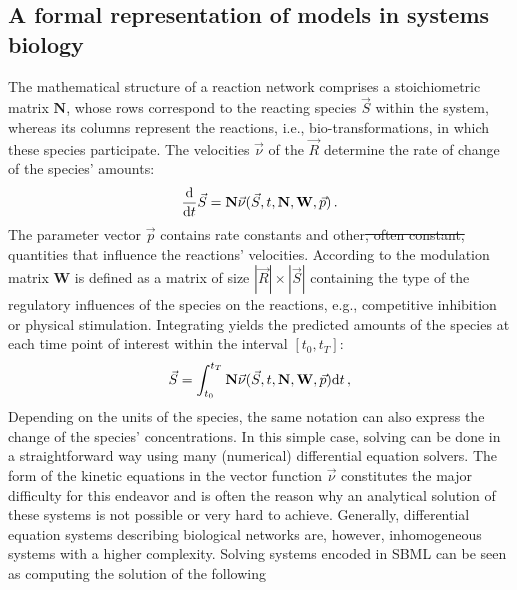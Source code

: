 \documentclass[10pt]{bmc_article}
\newenvironment{bmcformat}{\begin{raggedright}\baselineskip20pt\sloppy\setboolean{publ}{false}}{\end{raggedright}\baselineskip20pt\sloppy}
\begin{document}
\begin{bmcformat}
\subsection*{A formal representation of models in systems biology}

The mathematical structure of a reaction network comprises a stoichiometric
matrix $\mathbf{N}$, whose rows correspond to the reacting species $\vec{S}$
within the system, whereas its columns represent the reactions, i.e., bio-transformations,
in which these species participate.
The velocities $\vec{\nu}$ of the  $\vec{R}$ determine the rate of
change of the species' amounts:
\begin{equation}
\frac{\mathrm{d}}{\mathrm{d} t}\vec{S} = \mathbf{N}\vec{\nu}(\vec{S}, t, \mathbf{N}, \mathbf{W}, \vec{p})\,.
\label{eq:SpeciesChange}
\end{equation}
The parameter vector $\vec{p}$ contains rate constants
and other\sout{, often constant,} quantities that influence the reactions' velocities.
According to  \cite{Liebermeister2006, Liebermeister2010} the modulation matrix
$\mathbf{W}$ is defined as a matrix of size $|\vec{R}|\times|\vec{S}|$
containing  the type of the regulatory influences of the species on
the reactions, e.g., competitive inhibition or physical stimulation.
Integrating  yields the predicted amounts of the
species at each time point of interest within the interval $[t_0, t_T]$:
\begin{equation}
\vec{S} = \int_{t_0}^{t_T} \mathbf{N}\vec{\nu}(\vec{S}, t, \mathbf{N}, \mathbf{W}, \vec{p})
\mathrm{d} t\,,
\label{eq:SpeciesChangeIntegral}
\end{equation}
Depending on the units of the species, the same notation can also express the
change of the species' concentrations.
In this simple case, solving  can be done in a
straightforward way using many (numerical) differential equation solvers.
The  form of the kinetic equations in the vector function $\vec{\nu}$
constitutes the major difficulty for this endeavor and is often the reason why
an analytical solution of these systems is not possible or very hard to achieve.
Generally, differential equation systems describing biological networks are,
however, inhomogeneous systems with a higher complexity.
Solving systems encoded in \acs{SBML} can be seen as computing the solution of the following

\end{bmcformat}
\end{document}

